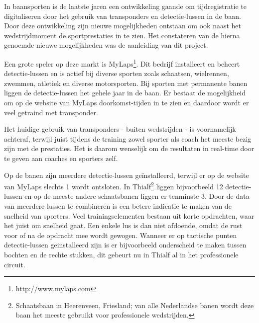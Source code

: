 In baansporten is de laatste jaren een ontwikkeling gaande om tijdregistratie te digitaliseren door het gebruik van transponders en detectie-lussen in de baan. Door deze ontwikkeling zijn nieuwe mogelijkheden ontstaan om ook naast het wedstrijdmoment de sportprestaties in te zien. Het constateren van de hierna genoemde nieuwe mogelijkheden was de aanleiding van dit project.

Een grote speler op deze markt is MyLaps\footnote{http://www.mylaps.com}. Dit bedrijf installeert en beheert detectie-lussen en is actief bij diverse sporten zoals schaatsen, wielrennen, zwemmen, atletiek en diverse motorsporten. Bij sporten met permanente banen liggen de detectie-lussen het gehele jaar in de baan. Er bestaat de mogelijkheid om op de website van MyLaps doorkomst-tijden in te zien en daardoor wordt er veel getraind met transponder.

Het huidige gebruik van transponders - buiten wedstrijden - is voornamelijk achteraf, terwijl juist tijdens de training zowel sporter als coach het meeste bezig zijn met de prestaties. Het is daarom wenselijk om de resultaten in real-time door te geven aan coaches en sporters zelf.

Op de banen zijn meerdere detectie-lussen geïnstalleerd, terwijl er op de website van MyLaps slechts 1 wordt ontsloten. In Thialf\footnote{Schaatsbaan in Heerenveen, Friesland; van alle Nederlandse banen wordt deze baan het meeste gebruikt voor professionele wedstrijden.} liggen bijvoorbeeld 12 detectie-lussen en op de meeste andere schaatsbanen liggen er tenminste 3. Door de data van meerdere lussen te combineren is een betere indicatie te maken van de snelheid van sporters. Veel trainingselementen bestaan uit korte opdrachten, waar het juist om snelheid gaat. Een enkele lus is dan niet afdoende, omdat de rust voor of na de opdracht mee wordt gewogen. Wanneer er op tactische punten detectie-lussen geinstalleerd zijn is er bijvoorbeeld onderscheid te maken tussen bochten en de rechte stukken, dit gebeurt nu in Thialf al in het professionele circuit.